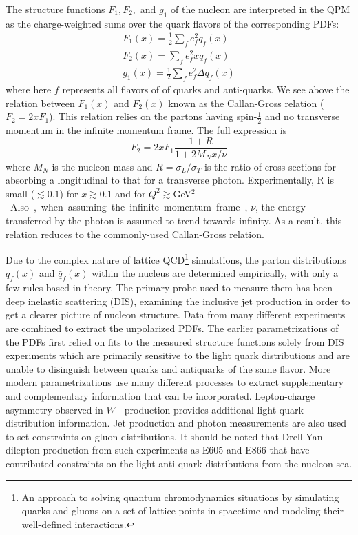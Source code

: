 The structure functions $F_1, F_2,$ and $g_1$ of the nucleon are interpreted in the QPM as the charge-weighted sums over the quark flavors of the corresponding PDFs:
\begin{eqnarray}
F_1(x) = \frac{1}{2} \sum\limits_f e_f^2 q_f(x) \label{eq:f1} \\
F_2(x) = \sum\limits_f e_f^2 x q_f(x) \label{eq:callan-gross} \label{eq:f2} \\
g_1(x) = \frac{1}{2} \sum\limits_f e_f^2 \Delta q_f(x) \label{eq:g1}
\end{eqnarray}
where here $f$ represents all flavors of of quarks and anti-quarks. We see above the relation between $F_1(x)$ and $F_2(x)$ known as the Callan-Gross relation ($F_2 = 2xF_1$). This relation relies on the partons having spin-$\frac{1}{2}$ and no transverse momentum in the infinite momentum frame. The full expression is
\begin{equation}
F_2 = 2xF_1 \frac{1 + R}{1 + 2 M_N x/\nu}
\end{equation}
where $M_N$ is the nucleon mass and $R=\sigma_L/\sigma_T$ is the ratio of cross sections for absorbing a longitudinal to that for a transverse photon. Experimentally, R is small\cite{PhysRevLett.61.1061} ($\lesssim0.1$) for $x\gtrsim0.1$ and for $Q^2\gtrsim$\unit[5]{GeV$^2$}. Also, when assuming the infinite momentum frame, $\nu$, the energy transferred by the photon is assumed to trend towards infinity. As a result, this relation reduces to the commonly-used Callan-Gross relation.

Due to the complex nature of lattice QCD\footnote{An approach to solving quantum chromodynamics situations by simulating quarks and gluons on a set of lattice points in spacetime and modeling their well-defined interactions.} simulations, the parton distributions $q_f(x)$ and $\bar{q}_f(x)$ within the nucleus are determined empirically, with only a few rules based in theory. The primary probe used to measure them has been deep inelastic scattering (DIS), examining the inclusive jet production in order to get a clearer picture of nucleon structure. Data from many different experiments are combined  to extract the unpolarized PDFs. The earlier parametrizations of the PDFs first relied on fits to the measured structure functions solely from DIS experiments which are primarily sensitive to the light quark distributions and are unable to disinguish between quarks and antiquarks of the same flavor. More modern parametrizations use many different processes to extract supplementary and complementary information that can be incorporated. Lepton-charge asymmetry observed in $W^\pm$ production provides additional light quark distribution information. Jet production and photon measurements are also used to set constraints on gluon distributions. It should be noted that Drell-Yan dilepton production from such experiments as E605 and E866 that have contributed constraints on the light anti-quark distributions from the nucleon sea.

